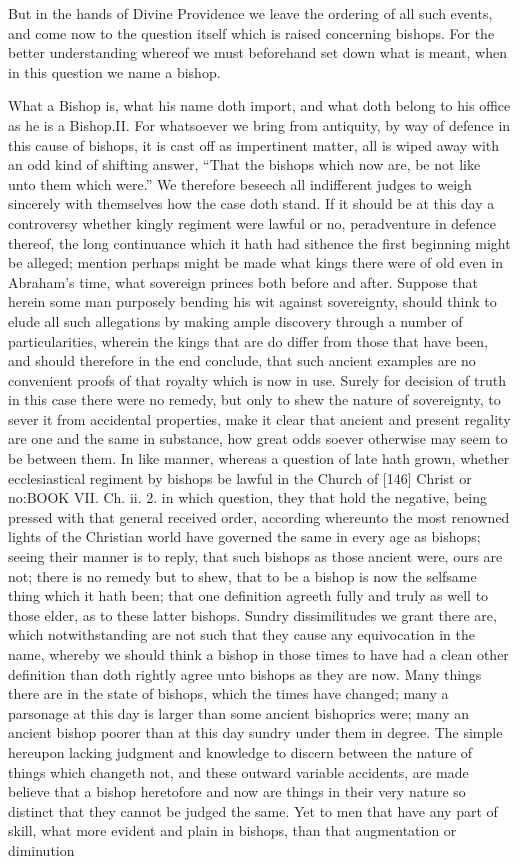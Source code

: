 But in the hands of Divine Providence we leave the ordering of all such events, and come now to the question itself which is raised concerning bishops. For the better understanding whereof we must beforehand set down what is meant, when in this question we name a bishop.

What a Bishop is, what his name doth import, and what doth belong to his office as he is a Bishop.II. For whatsoever we bring from antiquity, by way of defence in this cause of bishops, it is cast off as impertinent matter, all is wiped away with an odd kind of shifting answer, “That the bishops which now are, be not like unto them which were.” We therefore beseech all indifferent judges to weigh sincerely with themselves how the case doth stand. If it should be at this day a controversy whether kingly regiment were lawful or no, peradventure in defence thereof, the long continuance which it hath had sithence the first beginning might be alleged; mention perhaps might be made what kings there were of old even in Abraham’s time, what sovereign princes both before and after. Suppose that herein some man purposely bending his wit against sovereignty, should think to elude all such allegations by making ample discovery through a number of particularities, wherein the kings that are do differ from those that have been, and should therefore in the end conclude, that such ancient examples are no convenient proofs of that royalty which is now in use. Surely for decision of truth in this case there were no remedy, but only to shew the nature of sovereignty, to sever it from accidental properties, make it clear that ancient and present regality are one and the same in substance, how great odds soever otherwise may seem to be between them. In like manner, whereas a question of late hath grown, whether ecclesiastical regiment by bishops be lawful in the Church of [146] Christ or no:BOOK VII. Ch. ii. 2. in which question, they that hold the negative, being pressed with that general received order, according whereunto the most renowned lights of the Christian world have governed the same in every age as bishops; seeing their manner is to reply, that such bishops as those ancient were, ours are not; there is no remedy but to shew, that to be a bishop is now the selfsame thing which it hath been; that one definition agreeth fully and truly as well to those elder, as to these latter bishops. Sundry dissimilitudes we grant there are, which notwithstanding are not such that they cause any equivocation in the name, whereby we should think a bishop in those times to have had a clean other definition than doth rightly agree unto bishops as they are now. Many things there are in the state of bishops, which the times have changed; many a parsonage at this day is larger than some ancient bishoprics were; many an ancient bishop poorer than at this day sundry under them in degree. The simple hereupon lacking judgment and knowledge to discern between the nature of things which changeth not, and these outward variable accidents, are made believe that a bishop heretofore and now are things in their very nature so distinct that they cannot be judged the same. Yet to men that have any part of skill, what more evident and plain in bishops, than that augmentation or diminution 